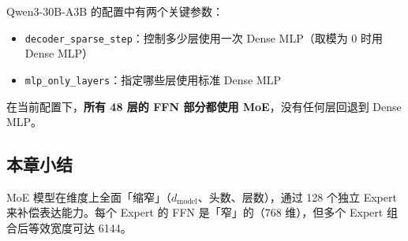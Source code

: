 Qwen3-30B-A3B 的配置中有两个关键参数：
\begin{itemize}
  \item \texttt{decoder\_sparse\_step}：控制多少层使用一次 Dense MLP（取模为 0 时用 Dense MLP）
  \item \texttt{mlp\_only\_layers}：指定哪些层使用标准 Dense MLP
\end{itemize}

在当前配置下，\textbf{所有 48 层的 FFN 部分都使用 MoE}，没有任何层回退到 Dense MLP。

\subsection{本章小结}

MoE 模型在维度上全面「缩窄」（$d_{\text{model}}$、头数、层数），通过 128 个独立 Expert 来补偿表达能力。每个 Expert 的 FFN 是「窄」的（768 维），但多个 Expert 组合后等效宽度可达 6144。

